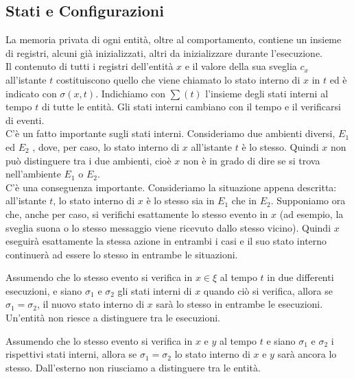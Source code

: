 \subsection{Stati e Configurazioni}
La memoria privata di ogni entità, oltre al comportamento, contiene un insieme
di registri, alcuni già inizializzati, altri da inizializzare durante
l'esecuzione.\\
Il contenuto di tutti i registri dell'entità $x$ e il valore della sua sveglia
$c_x$ all'istante $t$ costituiscono quello che viene chiamato lo stato interno
di $x$ in $t$ ed è indicato con $\sigma (x, t)$. Indichiamo con $\sum(t)$
l'insieme degli stati interni al tempo $t$ di tutte le entità. Gli stati interni
cambiano con il tempo e il verificarsi di eventi.\\
C'è un fatto importante sugli stati interni. Consideriamo due ambienti diversi,
$E_1$ ed $E_2$ , dove, per caso, lo stato interno di $x$ all'istante $t$ è lo
stesso. Quindi $x$ non può distinguere tra i due ambienti, cioè $x$ non è in
grado di dire se si trova nell'ambiente $E_1$ o $E_2$.\\
C'è una conseguenza importante. Consideriamo la situazione appena descritta:
all'istante $t$, lo stato interno di $x$ è lo stesso sia in $E_1$ che in $E_2$.
Supponiamo ora che, anche per caso, si verifichi esattamente lo stesso evento in
$x$ (ad esempio, la sveglia suona o lo stesso messaggio viene ricevuto dallo
stesso vicino). Quindi $x$ eseguirà esattamente la stessa azione in entrambi i
casi e il suo stato interno continuerà ad essere lo stesso in entrambe le
situazioni.

\begin{prop}

    Assumendo che lo stesso evento si verifica in $x \in  \xi$
    al tempo $t$ in due differenti esecuzioni, e siano $\sigma_1$ e $\sigma_2$ gli
    stati interni di $x$ quando ciò si verifica, allora se $\sigma_1 = \sigma_2$,
    il nuovo stato interno di $x$ sarà lo stesso in entrambe le esecuzioni.\\
    Un'entità non riesce a distinguere tra le esecuzioni.
\end{prop}

\begin{prop}
    Assumendo che lo stesso evento si verifica in $x$ e $y$ al
    tempo $t$ e siano $\sigma_1$ e $\sigma_2$ i rispettivi stati interni, allora
    se $\sigma_1 = \sigma_2$ lo stato interno di $x$ e $y$ sarà ancora lo stesso.
    Dall'esterno non riusciamo a distinguere tra le entità.
\end{prop}

